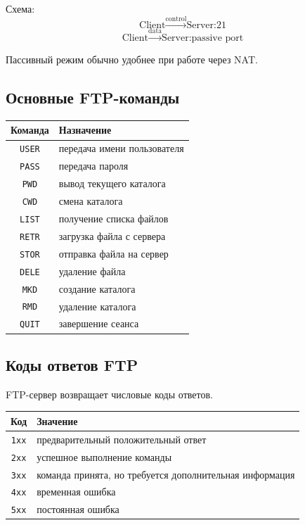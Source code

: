 \documentclass[12pt,a4paper]{article}
\begin{document}
Схема:
\[
\text{Client} \xrightarrow{\text{control}} \text{Server:21}
\]
\[
\text{Client} \xrightarrow{\text{data}} \text{Server:passive port}
\]

Пассивный режим обычно удобнее при работе через NAT.

\subsection{Основные FTP-команды}

\begin{center}
\begin{tabular}{|c|p{9cm}|}
\hline
Команда & Назначение \\
\hline
\texttt{USER} & передача имени пользователя \\
\hline
\texttt{PASS} & передача пароля \\
\hline
\texttt{PWD} & вывод текущего каталога \\
\hline
\texttt{CWD} & смена каталога \\
\hline
\texttt{LIST} & получение списка файлов \\
\hline
\texttt{RETR} & загрузка файла с сервера \\
\hline
\texttt{STOR} & отправка файла на сервер \\
\hline
\texttt{DELE} & удаление файла \\
\hline
\texttt{MKD} & создание каталога \\
\hline
\texttt{RMD} & удаление каталога \\
\hline
\texttt{QUIT} & завершение сеанса \\
\hline
\end{tabular}
\end{center}

\subsection{Коды ответов FTP}

FTP-сервер возвращает числовые коды ответов.

\begin{center}
\begin{tabular}{|c|p{9cm}|}
\hline
Код & Значение \\
\hline
\texttt{1xx} & предварительный положительный ответ \\
\hline
\texttt{2xx} & успешное выполнение команды \\
\hline
\texttt{3xx} & команда принята, но требуется дополнительная информация \\
\hline
\texttt{4xx} & временная ошибка \\
\hline
\texttt{5xx} & постоянная ошибка \\
\hline
\end{tabular}
\end{center}
\end{document}
